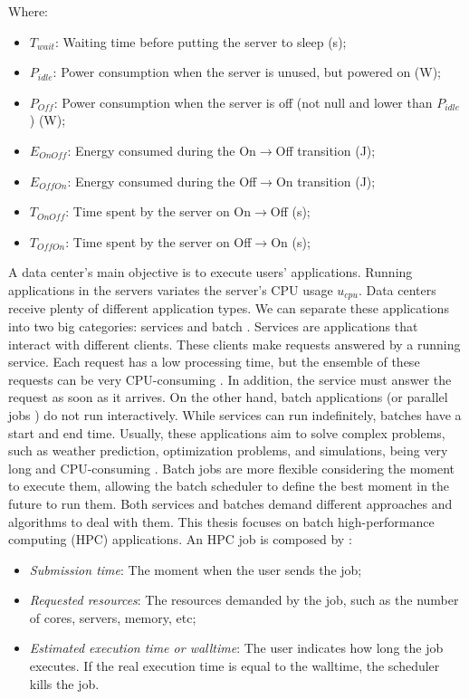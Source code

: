 Where:
\begin{itemize}
    \item $T_{wait}$: Waiting time before putting the server to sleep (s);
    \item $P_{idle}$: Power consumption when the server is unused, but powered on (W);
    \item $P_{Off}$: Power consumption when the server is off (not null and lower than $P_{idle}$) (W);
    \item $E_{OnOff}$: Energy consumed during the On$\rightarrow$Off transition (J);
    \item $E_{OffOn}$: Energy consumed during the Off$\rightarrow$On transition (J);
    \item $T_{OnOff}$: Time spent by the server on On$\rightarrow$Off (s);
    \item $T_{OffOn}$: Time spent by the server on Off$\rightarrow$On (s);
\end{itemize}

A data center's main objective is to execute users' applications. Running applications in the servers variates the server's CPU usage $u_{cpu}$. Data centers receive plenty of different application types. We can separate these applications into two big categories: services and batch \cite{rostirolla2022survey,da2018modeling}. Services are applications that interact with different clients. These clients make requests answered by a running service. Each request has a low processing time, but the ensemble of these requests can be very CPU-consuming \cite{masdari2020survey}. In addition, the service must answer the request as soon as it arrives. On the other hand, batch applications (or parallel jobs \cite{feitelson2014experience}) do not run interactively. While services can run indefinitely, batches have a start and end time. Usually, these applications aim to solve complex problems, such as weather prediction, optimization problems, and simulations, being very long and CPU-consuming \cite{masdari2020survey}. Batch jobs are more flexible considering the moment to execute them, allowing the batch scheduler to define the best moment in the future to run them. Both services and batches demand different approaches and algorithms to deal with them. This thesis focuses on batch high-performance computing (HPC) applications. An HPC job is composed by \cite{rostirolla2022survey, srinivasan2002characterization, takizawa2020effect}:

\begin{itemize}
    \item \textit{Submission time}: The moment when the user sends the job;
    \item \textit{Requested resources}: The resources demanded by the job, such as the number of cores, servers, memory, etc;
    \item \textit{Estimated execution time or walltime}: The user indicates how long the job executes. If the real execution time is equal to the walltime, the scheduler kills the job. 
\end{itemize}

